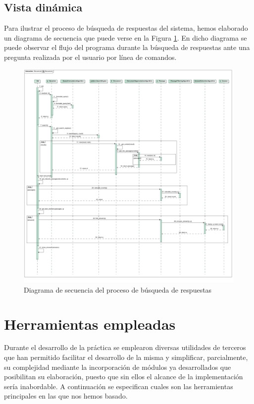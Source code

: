 \documentclass[12pt,a4paper,titlepage]{article}
\begin{document}
\subsection{Vista dinámica}
Para ilustrar el proceso de búsqueda de respuestas del sistema, hemos elaborado un diagrama de secuencia que puede verse en la Figura \ref{fig:secuencia}. En dicho diagrama se puede observar el flujo del programa durante la búsqueda de respuestas ante una pregunta realizada por el usuario por línea de comandos.

\begin{figure}[h!]
\begin{center}
\includegraphics[width=\textwidth]{res/secuencia}
\end{center}
\caption{Diagrama de secuencia del proceso de búsqueda de respuestas}
\label{fig:secuencia}
\end{figure}

\clearpage
\section{Herramientas empleadas}
Durante el desarrollo de la práctica se emplearon diversas utilidades de terceros que han permitido facilitar el desarrollo de la misma y simplificar, parcialmente, su complejidad mediante la incorporación de módulos ya desarrollados que posibilitan su elaboración, puesto que sin ellos el alcance de la implementación sería inabordable. A continuación se especifican cuales son las herramientas principales en las que nos hemos basado.
\end{document}
